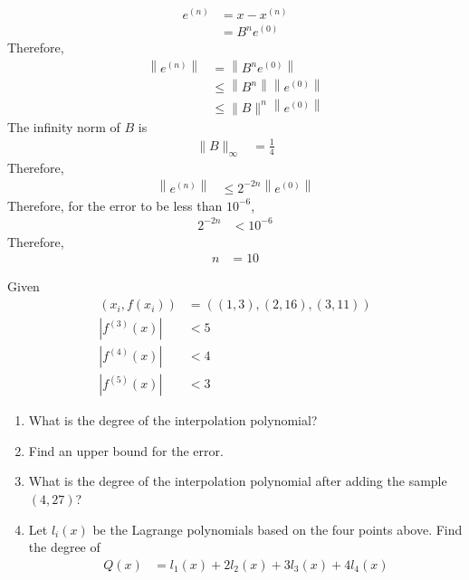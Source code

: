 \documentclass[fleqn, a4paper, 12pt, twoside, titlepage]{article}
\theoremstyle{definition}
\theoremstyle{theorem}
\begin{document}
\begin{solution}
\begin{enumerate}[leftmargin=*]
\begin{align*}
				e^{(n)} &= x - x^{(n)}\\
				&= B^n e^{(0)}
			\end{align*}
			Therefore,
			\begin{align*}
				\left\| e^{(n)} \right\| &= \left\| B^n e^{(0)} \right\|\\
				&\le \left\| B^n \right\| \left\| e^{(0)} \right\|\\
				&\le \|B\|^n \left\|e^{(0)} \right\|
			\end{align*}
			The infinity norm of $B$ is
			\begin{align*}
				\|B\|_{\infty} &= \frac{1}{4}
			\end{align*}
			Therefore,
			\begin{align*}
				\left\| e^{(n)} \right\| &\le 2^{-2 n} \left\| e^{(0)} \right\|
			\end{align*}
			Therefore, for the error to be less than $10^{-6}$,
			\begin{align*}
				2^{-2 n} &< 10^{-6}
			\end{align*}
			Therefore,
			\begin{align*}
				n &= 10
			\end{align*}
	\end{enumerate}
\end{solution}

\begin{question}
	Given
	\begin{align*}
		\left( x_i,f(x_i) \right) &= \left( (1,3),(2,16),(3,11) \right)\\
		\left| f^{(3)}(x) \right| &< 5\\
		\left| f^{(4)}(x) \right| &< 4\\
		\left| f^{(5)}(x) \right| &< 3
	\end{align*}
	\begin{enumerate}
		\item
			What is the degree of the interpolation polynomial?
		\item
			Find an upper bound for the error.
		\item
			What is the degree of the interpolation polynomial after adding the sample $(4,27)$?
		\item
			Let $l_i(x)$ be the Lagrange polynomials based on the four points above.
			Find the degree of
			\begin{align*}
				Q(x) &= l_1(x) + 2 l_2(x) + 3 l_3(x) + 4 l_4(x)
			\end{align*}
	\end{enumerate}
\end{question}
\end{document}
